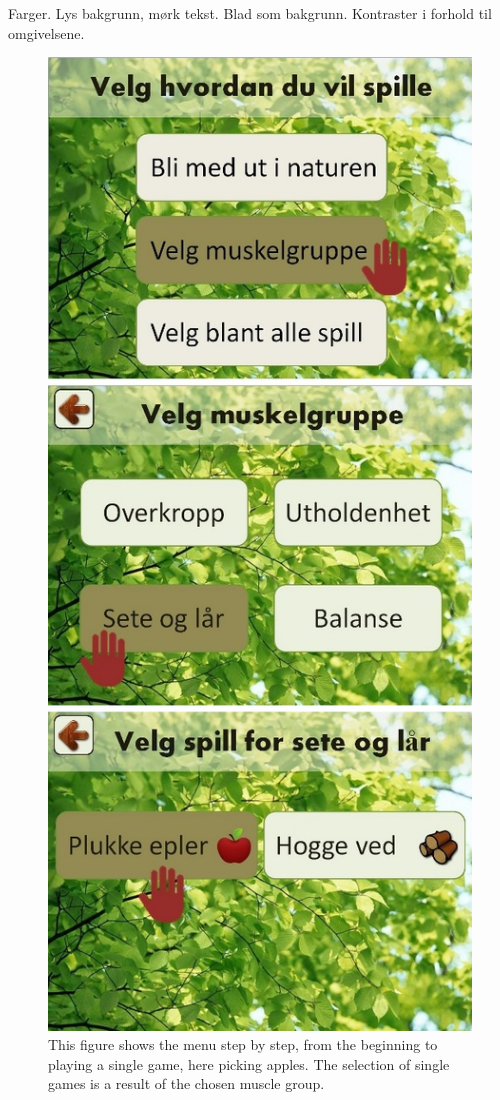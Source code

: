 Farger.
Lys bakgrunn, mørk tekst.
Blad som bakgrunn.
Kontraster i forhold til omgivelsene. 

\begin{figure} [ht!]
\centering
\includegraphics[scale=0.5]{menuStep1.jpg}
\caption[The menu, part one]{This figure shows the menu step by step, from the beginning to playing a single game, here picking apples. The selection of single games is a result of the chosen muscle group.}
\label{menu1}
\end{figure}

